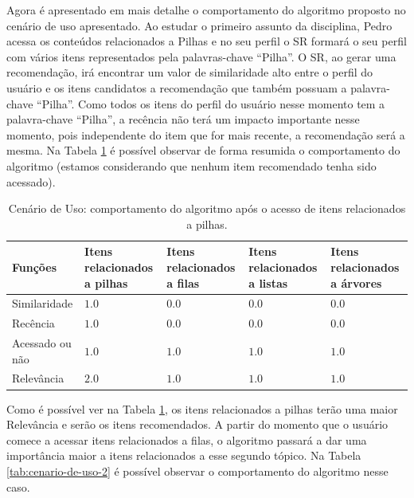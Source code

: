 Agora é apresentado em mais detalhe o comportamento do algoritmo proposto no cenário de uso apresentado.
Ao estudar o primeiro assunto da disciplina, Pedro acessa os conteúdos relacionados a Pilhas e no seu perfil
o SR formará o seu perfil com vários itens representados pela palavras-chave ``Pilha''. O SR, ao gerar uma recomendação,
irá encontrar um valor de similaridade alto entre o perfil do usuário e os itens candidatos a recomendação que também possuam
a palavra-chave ``Pilha''. Como todos os itens do perfil do usuário nesse momento tem a palavra-chave ``Pilha'', a recência não
terá um impacto importante nesse momento, pois independente do item que for mais recente, a recomendação será a mesma. Na
Tabela \ref{tab:cenario-de-uso-1} é possível observar de forma resumida o comportamento do algoritmo (estamos considerando
que nenhum item recomendado tenha sido acessado).

\begin{table}[h]
\footnotesize
\caption[Cenário de Uso: comportamento do algoritmo após o acesso de itens relacionados a pilhas.]{Cenário de Uso: comportamento do algoritmo após o acesso de itens relacionados a pilhas.}
\label{tab:cenario-de-uso-1}
\centering
\begin{tabular}{|p{2cm}|p{2.5cm}|p{2.5cm}|p{2.5cm}|p{2.5cm}|}
  \hline
  \textbf{Funções} & \textbf{Itens relacionados a pilhas} & \textbf{Itens relacionados a filas} & \textbf{Itens relacionados a listas} & \textbf{Itens relacionados a árvores} \\
  \hline
  Similaridade & $1.0$ & $0.0$ & $0.0$ & $0.0$ \\
  \hline
  Recência & $1.0$ & $0.0$ & $0.0$ & $0.0$ \\
  \hline
  Acessado ou não & $1.0$ & $1.0$ & $1.0$ & $1.0$ \\
  \hline
  Relevância & $2.0$ & $1.0$ & $1.0$ & $1.0$ \\
  \hline
\end{tabular}
\end{table}

Como é possível ver na Tabela \ref{tab:cenario-de-uso-1}, os itens relacionados a pilhas terão uma maior
Relevância e serão os itens recomendados. A partir do momento que o usuário comece a acessar itens relacionados a filas,
o algoritmo passará a dar uma importância maior a itens relacionados a esse segundo tópico. Na Tabela
\ref{tab:cenario-de-uso-2} é possível observar o comportamento do algoritmo nesse caso.

